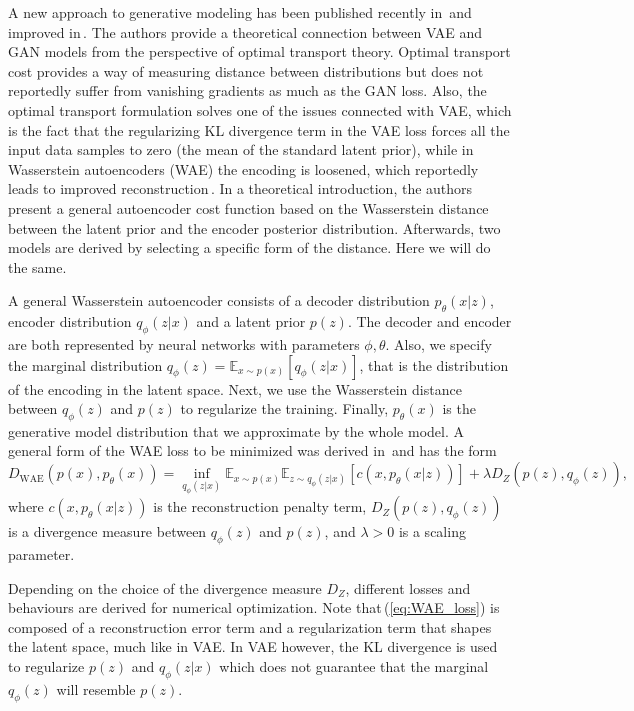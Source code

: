 A new approach to generative modeling has been published recently
in\,\cite{mescheder2017adversarial} and improved in\,\cite{tolstikhin2017wasserstein}.
The authors provide a theoretical connection between VAE and GAN models
from the perspective of optimal transport theory. Optimal transport
cost provides a way of measuring distance between distributions but
does not reportedly suffer from vanishing gradients as much as the
GAN loss. Also, the optimal transport formulation solves one of the
issues connected with VAE, which is the fact that the regularizing
KL divergence term in the VAE loss forces all the input data samples
to zero (the mean of the standard latent prior), while in Wasserstein
autoencoders (WAE) the encoding is loosened, which reportedly leads
to improved reconstruction\,\cite{tolstikhin2017wasserstein}. In
a theoretical introduction, the authors present a general autoencoder
cost function based on the Wasserstein distance between the latent
prior and the encoder posterior distribution. Afterwards, two models
are derived by selecting a specific form of the distance. Here we
will do the same.

 

A general Wasserstein autoencoder consists of a decoder distribution
$p_{\theta}(x|z)$, encoder distribution $q_{\phi}(z|x)$ and a latent
prior $p(z)$. The decoder and encoder are both represented by neural
networks with parameters $\phi,\theta$. Also, we specify the marginal
distribution $q_{\phi}(z)=\mathbb{E}_{x\sim p(x)}\left[q_{\phi}(z|x)\right]$,
that is the distribution of the encoding in the latent space. Next,
we use the Wasserstein distance between $q_{\phi}(z)$ and $p(z)$
to regularize the training. Finally, $p_{\theta}(x)$ is the generative
model distribution that we approximate by the whole model. A general
form of the WAE loss to be minimized was derived in\,\cite{tolstikhin2017wasserstein}
and has the form
\begin{equation}
D_{\text{WAE}}(p(x),p_{\theta}(x))=\inf_{q_{\phi}(z|x)}\mathbb{E}_{x\sim p(x)}\mathbb{E}_{z\sim q_{\phi}(z|x)}\left[c(x,p_{\theta}(x|z))\right]+\lambda D_{Z}(p(z),q_{\phi}(z)),\label{eq:WAE_loss}
\end{equation}
where $c(x,p_{\theta}(x|z))$ is the reconstruction penalty term,
$D_{Z}(p(z),q_{\phi}(z))$ is a divergence measure between $q_{\phi}(z)$
and $p(z)$, and $\lambda>0$ is a scaling parameter. 

Depending on the choice of the divergence measure $D_{Z}$, different
losses and behaviours are derived for numerical optimization. Note
that\,(\ref{eq:WAE_loss}) is composed of a reconstruction error
term and a regularization term that shapes the latent space, much
like in VAE. In VAE however, the KL divergence is used to regularize
$p(z)$ and $q_{\phi}(z|x)$ which does not guarantee that the marginal
$q_{\phi}(z)$ will resemble $p(z)$. 

